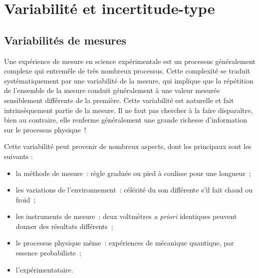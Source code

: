 \documentclass[../../main/main.tex]{subfiles}
\begin{document}
\section{Variabilité et incertitude-type}
\subsection{Variabilités de mesures}
Une expérience de mesure en science expérimentale est un processus généralement
complexe qui entremêle de très nombreux processus. Cette complexité se traduit
systématiquement par une variabilité de la mesure, qui implique que la
répétition de l'ensemble de la mesure conduit généralement à une valeur mesurée
sensiblement différente de la première. Cette variabilité est naturelle et fait
intrinsèquement partie de la mesure. Il ne faut pas chercher à la faire
disparaître, bien au contraire, elle renferme généralement une grande richesse
d'information sur le processus physique~!

Cette variabilité peut provenir de nombreux aspects, dont les principaux sont
les suivants :
\begin{itemize}
	\item la méthode de mesure~: règle graduée ou pied à coulisse pour une
	      longueur~;
	\item les variations de l'environnement~: célérité du son différente s'il fait
	      chaud ou froid~;
	\item les instruments de mesure~: deux voltmètres \textit{a priori} identiques
	      peuvent donner des résultats différents~;
	\item le processus physique même~: expériences de mécanique quantique, par
	      essence probabiliste~;
	\item l'expérimentataire.
\end{itemize}
\end{document}
